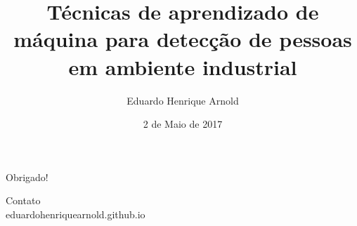 \documentclass{beamer}
\title{Técnicas de aprendizado de máquina para detecção de pessoas em ambiente industrial}
\date{2 de Maio de 2017}
\author{Eduardo Henrique Arnold}
\institute{Universidade Federal de Santa Catarina}
\begin{document}
	\maketitle

	
	
	
	
	

	\begin{frame}[standout]
	  Obrigado!

		Contato\\
		eduardohenriquearnold.github.io
	\end{frame}
\end{document}
